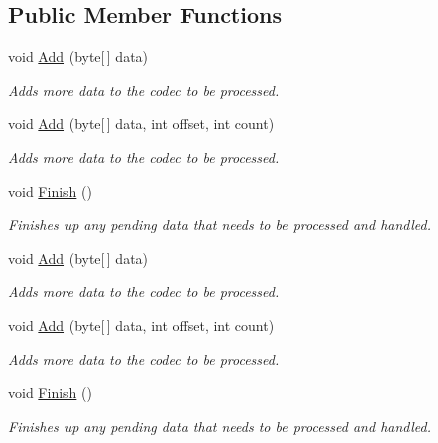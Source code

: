 \subsection*{Public Member Functions}
\begin{DoxyCompactItemize}
\item 
void \hyperlink{interface_dot_z_lib_1_1_codec_aa40d0820bd95f098b3e7d8e707e7a536}{Add} (byte\mbox{[}$\,$\mbox{]} data)
\begin{DoxyCompactList}\small\item\em Adds more data to the codec to be processed. \end{DoxyCompactList}\item 
void \hyperlink{interface_dot_z_lib_1_1_codec_a137234d0c6fa6981ca8b602340e79dbc}{Add} (byte\mbox{[}$\,$\mbox{]} data, int offset, int count)
\begin{DoxyCompactList}\small\item\em Adds more data to the codec to be processed. \end{DoxyCompactList}\item 
void \hyperlink{interface_dot_z_lib_1_1_codec_af12b887d445dcbc5e7c11b3aa000aa27}{Finish} ()
\begin{DoxyCompactList}\small\item\em Finishes up any pending data that needs to be processed and handled. \end{DoxyCompactList}\item 
void \hyperlink{interface_dot_z_lib_1_1_codec_aa40d0820bd95f098b3e7d8e707e7a536}{Add} (byte\mbox{[}$\,$\mbox{]} data)
\begin{DoxyCompactList}\small\item\em Adds more data to the codec to be processed. \end{DoxyCompactList}\item 
void \hyperlink{interface_dot_z_lib_1_1_codec_a137234d0c6fa6981ca8b602340e79dbc}{Add} (byte\mbox{[}$\,$\mbox{]} data, int offset, int count)
\begin{DoxyCompactList}\small\item\em Adds more data to the codec to be processed. \end{DoxyCompactList}\item 
void \hyperlink{interface_dot_z_lib_1_1_codec_af12b887d445dcbc5e7c11b3aa000aa27}{Finish} ()
\begin{DoxyCompactList}\small\item\em Finishes up any pending data that needs to be processed and handled. \end{DoxyCompactList}\end{DoxyCompactItemize}
